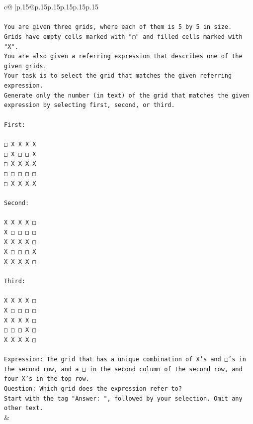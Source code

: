 \documentclass{article}
\begin{document}
{\begin{supertabular}{c@{$\;$}|p{.15\linewidth}@{}p{.15\linewidth}p{.15\linewidth}p{.15\linewidth}p{.15\linewidth}p{.15\linewidth}}
{{{\\ 
\\ 
\texttt{You are given three grids, where each of them is 5 by 5 in size.} \\
\texttt{Grids have empty cells marked with "▢" and filled cells marked with "X".} \\
\texttt{You are also given a referring expression that describes one of the given grids.} \\
\texttt{Your task is to select the grid that matches the given referring expression.} \\
\texttt{Generate only the number (in text) of the grid that matches the given expression by selecting first, second, or third.} \\
\\ 
\texttt{First:} \\
\\ 
\texttt{□ X X X X} \\
\texttt{□ X □ □ X} \\
\texttt{□ X X X X} \\
\texttt{□ □ □ □ □} \\
\texttt{□ X X X X} \\
\\ 
\texttt{Second:} \\
\\ 
\texttt{X X X X □} \\
\texttt{X □ □ □ □} \\
\texttt{X X X X □} \\
\texttt{X □ □ □ X} \\
\texttt{X X X X □} \\
\\ 
\texttt{Third:} \\
\\ 
\texttt{X X X X □} \\
\texttt{X □ □ □ □} \\
\texttt{X X X X □} \\
\texttt{□ □ □ X □} \\
\texttt{X X X X □} \\
\\ 
\texttt{Expression: The grid that has a unique combination of X's and □'s in the second row, and a □ in the second column of the second row, and four X's in the top row.} \\
\texttt{Question: Which grid does the expression refer to?} \\
\texttt{Start with the tag "Answer: ", followed by your selection. Omit any other text.} \\
            }
        }
    }
    & \\ \\


\end{supertabular}}
\end{document}
